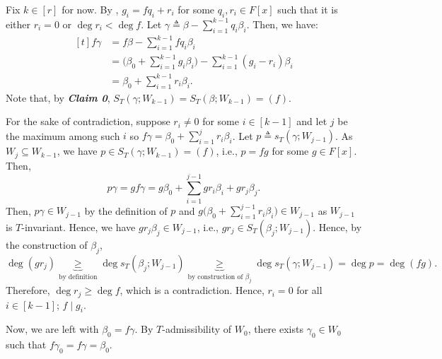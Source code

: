 \documentclass[MAS212_Note.tex]{subfiles}
\begin{document}
{    

    Fix \(k \in [r]\) for now.
    By , \(g_i = fq_i + r_i\)
    for some \(q_i, r_i \in F[x]\) such that it is either \(r_i = 0\)
    or \(\deg r_i < \deg f\).
    Let \(\gamma \triangleq \beta - \sum_{i=1}^{k-1} q_i \beta_i\).
    Then, we have:
    \[\begin{aligned}[t]
        f\gamma &= f\beta - \textstyle\sum_{i=1}^{k-1} fq_i \beta_i \\
                  &= \textstyle\big(\beta_0 + \sum_{i=1}^{k-1} g_i \beta_i\big)
                      - \sum_{i=1}^{k-1} (g_i-r_i) \beta_i \\
                  &= \textstyle \beta_0 + \sum_{i=1}^{k-1} r_i \beta_i.
    \end{aligned}\]
    Note that, by \textbf{\textit{Claim 0}}, \(S_T(\gamma; W_{k-1}) = S_T(\beta; W_{k-1}) = (f)\).

    For the sake of contradiction, suppose \(r_i \neq 0\) for some \(i \in [k-1]\) and
    let \(j\) be the maximum among such \(i\) so
    \(f\gamma = \beta_0 + \sum_{i=1}^{j} r_i \beta_i\).
    Let \(p \triangleq s_T(\gamma; W_{j-1})\).
    As \(W_j \subseteq W_{k-1}\), we have \(p \in S_T(\gamma; W_{k-1}) = (f)\), i.e.,
    \(p = fg\) for some \(g \in F[x]\). Then,
    \[\textstyle
        p \gamma = gf \gamma = g \beta_0 + \sum_{i=1}^{j-1} gr_i \beta_i + g r_j \beta_j.
    \]
    Then, \(p \gamma \in W_{j-1}\) by the definition of \(p\)
    and \(g \big(\beta_0 + \sum_{i=1}^{j-1} r_i \beta_i\big) \in W_{j-1}\)
    as \(W_{j-1}\) is \(T\)-invariant. Hence, we have \(g r_j \beta_j \in W_{j-1}\),
    i.e., \(g r_j \in S_T(\beta_j; W_{j-1})\).
    Hence, by the construction of \(\beta_j\), \[
        \deg (g r_j) 
        \underbrace{\ge}_{\text{by definition}}
        \deg s_T(\beta_j; W_{j-1})
        \underbrace{\ge}_{\text{by construction of } \beta_j}
        \deg s_T(\gamma; W_{j-1}) = \deg p = \deg (fg).
    \]
    Therefore, \(\deg r_j \ge \deg f\), which is a contradiction.
    Hence, \(r_i = 0\) for all \(i \in [k-1]\); \(f \mid g_i\).

    Now, we are left with \(\beta_0 = f \gamma\).
    By \(T\)-admissibility of \(W_0\), there exists \(\gamma_0 \in W_0\)
    such that \(f \gamma_0 = f \gamma = \beta_0\). \checkmark
    \vspace*{.7em}

}
\end{document}
